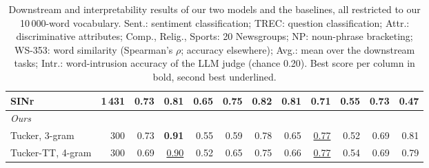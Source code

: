 \begin{table}[t]
\begin{tabular}{lrrrrrrrrrrr}
    SINr & 1\,431 & 0.73 & 0.81 & \textbf{0.65} & 0.75 & 0.82 & 0.81 & 0.71 & 0.55 & 0.73 & 0.47 \\
    \midrule
    \multicolumn{12}{l}{\textit{Ours}} \\
    Tucker, 3-gram & 300 & 0.73 & \textbf{0.91} & 0.55 & 0.59 & 0.78 & 0.65 & \underline{0.77} & 0.52 & 0.69 & 0.81 \\
    Tucker-TT, 4-gram & 300 & 0.69 & \underline{0.90} & 0.52 & 0.65 & 0.75 & 0.66 & \underline{0.77} & 0.54 & 0.69 & 0.79 \\
    \bottomrule
  \end{tabular}
  \caption{Downstream and interpretability results of our two models and the baselines, all restricted to our 10\,000-word vocabulary. Sent.: sentiment classification; TREC: question classification; Attr.: discriminative attributes; Comp., Relig., Sports: 20 Newsgroups; NP: noun-phrase bracketing; WS-353: word similarity (Spearman's $\rho$; accuracy elsewhere); Avg.: mean over the downstream tasks; Intr.: word-intrusion accuracy of the LLM judge (chance 0.20). Best score per column in bold, second best underlined.}
  \label{tab:baselines}
\end{table}


